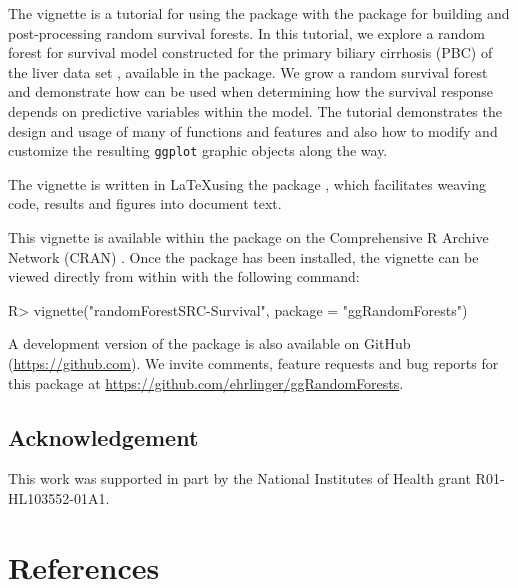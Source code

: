 \documentclass[article]{jss}
\begin{document}
The vignette is a tutorial for using the  package
with the  package for building and post-processing
random survival forests. In this tutorial, we explore a random forest
for survival model constructed for the primary biliary cirrhosis (PBC)
of the liver data set \citep{fleming:1991}, available in the
 package. We grow a random survival forest and
demonstrate how  can be used when determining how
the survival response depends on predictive variables within the model.
The tutorial demonstrates the design and usage of many of
 functions and features and also how to modify and
customize the resulting \texttt{ggplot} graphic objects along the way.

The vignette is written in \LaTeX using the  package
\citep[\url{http://CRAN.R-project.org/package=knitr}]{Xie:2015, Xie:2014,Xie:2013},
which facilitates weaving  \citep{rcore} code, results and
figures into document text.

This vignette is available within the  package on
the Comprehensive R Archive Network (CRAN)
\citep[\url{http://cran.r-project.org}]{rcore}. Once the package has
been installed, the vignette can be viewed directly from within
 with the following command:

\begin{Schunk}
\begin{Sinput}
R> vignette("randomForestSRC-Survival", package = "ggRandomForests")
\end{Sinput}
\end{Schunk}

A development version of the  package is also
available on GitHub (\url{https://github.com}). We invite comments,
feature requests and bug reports for this package at
\url{https://github.com/ehrlinger/ggRandomForests}.

\subsection{Acknowledgement}\label{acknowledgement}

This work was supported in part by the National Institutes of Health
grant R01-HL103552-01A1.

\section{References}\label{references}
\end{document}
